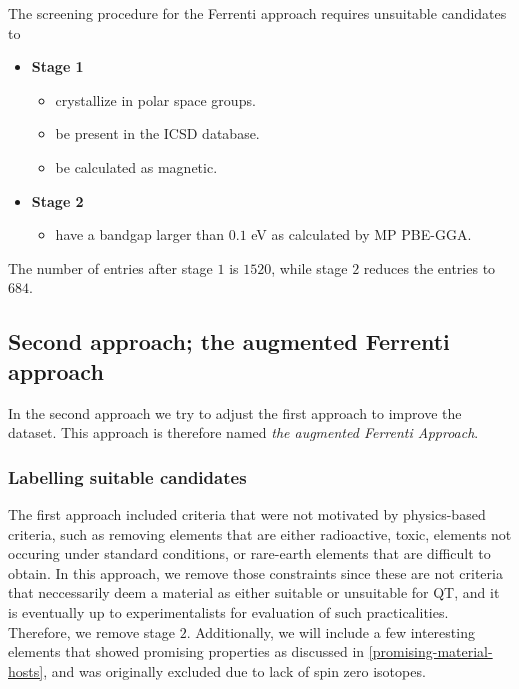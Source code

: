 The screening procedure for the Ferrenti approach requires unsuitable candidates to

\begin{itemize}
  \item[]{\textbf{Stage 1}}
  \begin{itemize}
  \item crystallize in polar space groups.
  \item be present in the ICSD database.
  \item be calculated as magnetic.
  \end{itemize}
  \item[]{\textbf{Stage 2}}
  \begin{itemize}
  \item have a bandgap larger than $0.1$ eV as calculated by MP PBE-GGA.
  \end{itemize}
\end{itemize}

\noindent The number of entries after stage $1$ is $1520$, while stage $2$ reduces the entries to $684$.

\subsection{Second approach; the augmented Ferrenti approach}

In the second approach we try to adjust the first approach to improve the dataset. This approach is therefore named \textit{the augmented Ferrenti Approach}.

\subsubsection{Labelling suitable candidates}

The first approach included criteria that were not motivated by physics-based criteria, such as removing elements that are either radioactive, toxic, elements not occuring under standard conditions, or rare-earth elements that are difficult to obtain. In this approach, we remove those constraints since these are not criteria that neccessarily deem a material as either suitable or unsuitable for QT, and it is eventually up to experimentalists for evaluation of such practicalities. Therefore, we remove stage $2$. Additionally, we will include a few interesting elements that showed promising properties as discussed in \autoref{promising-material-hosts}, and was originally excluded due to lack of spin zero isotopes.

